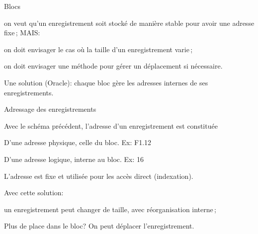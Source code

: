 \begin{frame}{Blocs}

\begin{redbullet}
  \item on veut qu'un enregistrement soit stocké de manière \alert{stable}
     pour avoir une adresse \alert{fixe}\,; \alert{MAIS}:
   \item on doit envisager le cas où la taille d'un enregistrement
                   varie\,;
   \item on doit envisager  une méthode pour gérer un déplacement si nécessaire.
\end{redbullet}

\vfill
Une solution (Oracle): chaque bloc gère les adresses internes de ses enregistrements.

\vfill



\end{frame}


\begin{frame}{Adressage des enregistrements}

Avec le schéma précédent, \alert{l'adresse} d'un enregistrement est constituée

\begin{redbullet}
  \item D'une adresse \alert{physique}, celle du bloc. Ex: F1.12
  \item D'une adresse \alert{logique}, interne au bloc. Ex: 16
\end{redbullet}
L'adresse est \alert{fixe} et utilisée pour les \alert{accès direct} (indexation).

\vfill

Avec cette solution:
\vfill

\begin{blocgauche}
\begin{redbullet}
  \item un enregistrement peut changer de taille, avec réorganisation
                interne\,;

  \item Plus de place dans le bloc? On peut déplacer l'enregistrement.
\end{redbullet}
\end{blocgauche}


\end{frame}

